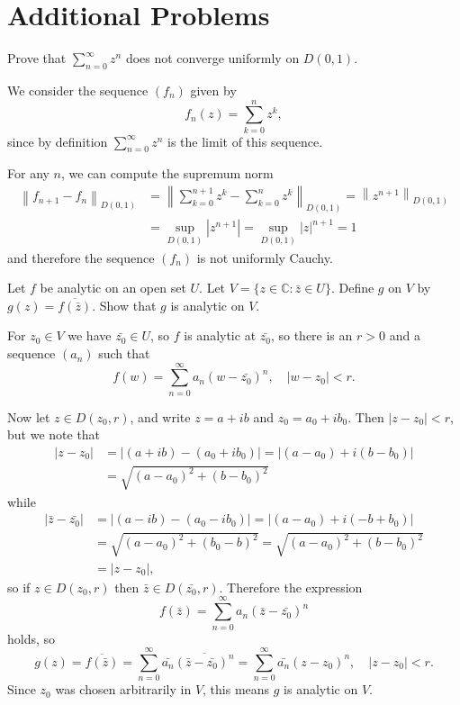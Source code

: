 \documentclass{article}
\newcounter{Problem}
\newenvironment{Problem}{\begin{Exercise}[name={Problem},
                                          counter={Problem}]}
                        {\end{Exercise}}
\begin{document}
\section{Additional Problems}

\begin{Problem}
  Prove that $\sum_{n=0}^\infty z^n$ does not converge uniformly on
  $D(0, 1)$.
\end{Problem}

\begin{Answer}
  We consider the sequence $(f_n)$ given by
  $$
  f_n(z) = \sum_{k=0}^n z^k,
  $$
  since by definition $\sum_{n=0}^\infty z^n$ is the limit
  of this sequence.

  For any $n$, we can compute the supremum norm
  \begin{align*}
    \left\|
      f_{n+1} - f_n
    \right\|_{D(0,1)}
  &=
    \left\|
      \sum_{k=0}^{n+1} z^k
    - \sum_{k=0}^{n} z^k
    \right\|_{D(0,1)}
   =
  \left\|
    z^{n+1}
  \right\|_{D(0,1)} \\
  &=
  \sup_{D(0,1)} |z^{n+1}|
   =
  \sup_{D(0,1)} |z|^{n+1}
   = 1
  \end{align*}
  and therefore the sequence $(f_n)$ is not uniformly
  Cauchy.
\end{Answer}

\begin{Problem}
  Let $f$ be analytic on an open set $U$. Let
  $V = \{ z \in \mathbb{C} : \bar{z} \in U \}$. Define $g$ on $V$ by
  $g(z) = \overline{f(\bar{z})}$. Show that $g$ is analytic on $V$.
\end{Problem}

\begin{Answer}
For $z_0 \in V$ we have $\bar{z_0} \in U$, so
$f$ is analytic at $\bar{z_0}$, so there is an
$r > 0$ and a sequence $(a_n)$ such that
$$
  f(w)
= \sum_{n=0}^\infty a_n(w - \bar{z_0})^n, \quad
  |w - z_0| < r.
$$

Now let $z \in D(z_0, r)$, and write $z = a + ib$ and
$z_0 = a_0 + ib_0$. Then $|z - z_0| < r$, but we note that
\begin{align*}
  |z - z_0|
&= |(a + ib) - (a_0 + ib_0)|
 = |(a - a_0) + i(b - b_0)| \\
&= \sqrt{(a - a_0)^2 + (b - b_0)^2}
\end{align*}
while
\begin{align*}
  |\bar{z} - \bar{z_0}|
&= |(a - ib) - (a_0 - ib_0)|
 = |(a - a_0) + i(-b + b_0)| \\
&= \sqrt{(a - a_0)^2 + (b_0 - b)^2}
 = \sqrt{(a - a_0)^2 + (b - b_0)^2} \\
&= |z - z_0|,
\end{align*}
so if $z \in D(z_0, r)$ then $\bar{z} \in D(\bar{z_0}, r)$. Therefore
the expression
$$
f(\bar{z})
= \sum_{n=0}^\infty a_n (\bar{z} - \bar{z_0})^n
$$
holds, so
$$
  g(z)
= \overline{f(\bar{z})}
= \sum_{n=0}^\infty \bar{a_n}
                 \overline{(\bar{z} - \bar{z_0})^n}
= \sum_{n=0}^\infty \bar{a_n}
                 (z - z_0)^n, \quad
|z - z_0| < r.
$$
Since $z_0$ was chosen arbitrarily
in $V$, this means $g$ is analytic on $V$.
\end{Answer}
\end{document}
